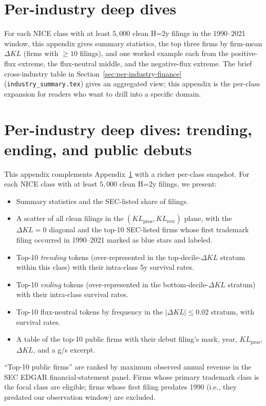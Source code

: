 \documentclass[11pt]{article}
\begin{document}
\section{Per-industry deep dives}
\label{app:per-industry}

For each NICE class with at least $5{,}000$ clean H=2y filings in the
1990--2021 window, this appendix gives summary statistics, the top
three firms by firm-mean $\Delta KL$ (firms with $\geq 10$ filings),
and one worked example each from the positive-flux extreme, the
flux-neutral middle, and the negative-flux extreme. The brief
cross-industry table in Section~\ref{sec:per-industry-finance}
(\texttt{industry\_summary.tex}) gives an aggregated view; this
appendix is the per-class expansion for readers who want to drill
into a specific domain.



\section{Per-industry deep dives: trending, ending, and public debuts}
\label{app:per-industry-deep}

This appendix complements Appendix~\ref{app:per-industry} with a
richer per-class snapshot. For each NICE class with at least
$5{,}000$ clean H=2y filings, we present:
\begin{itemize}
  \item Summary statistics and the SEC-listed share of filings.
  \item A scatter of all clean filings in the $(KL_\text{pros},
        KL_\text{retr})$ plane, with the $\Delta KL = 0$ diagonal
        and the top-10 SEC-listed firms whose first trademark filing
        occurred in 1990--2021 marked as blue stars and labeled.
  \item Top-10 \emph{trending} tokens (over-represented in the
        top-decile-$\Delta KL$ stratum within this class) with their
        intra-class 5y survival rates.
  \item Top-10 \emph{ending} tokens (over-represented in the
        bottom-decile-$\Delta KL$ stratum) with their intra-class
        survival rates.
  \item Top-10 flux-neutral tokens by frequency in the
        $|\Delta KL| \leq 0.02$ stratum, with survival rates.
  \item A table of the top-10 public firms with their debut filing's
        mark, year, $KL_\text{pros}$, $\Delta KL$, and a g/s excerpt.
\end{itemize}
``Top-10 public firms'' are ranked by maximum observed annual revenue
in the SEC EDGAR financial-statement panel. Firms whose primary
trademark class is the focal class are eligible; firms whose first
filing predates 1990 (i.e., they predated our observation window) are
excluded.


\end{document}
